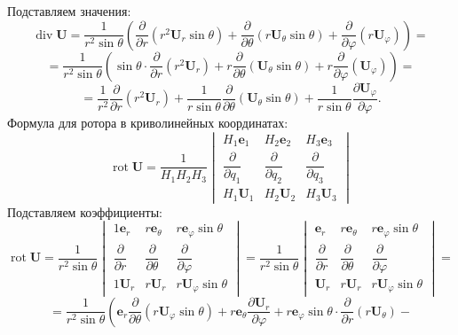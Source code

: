 \documentclass{article}
\begin{document}
\begin{enumerate}
{Подставляем значения:
$$\operatorname{div}\textbf{U} = \dfrac {1}{r^2 \sin{\theta}} \left( \dfrac {\partial}{\partial r} \left(r^2 \textbf{U}_r \sin{\theta}\right) + \dfrac {\partial}{\partial \theta} \left(r \textbf{U}_\theta \sin{\theta}\right) + \dfrac {\partial}{\partial \varphi} \left(r\textbf{U}_\varphi\right)\right)=$$
$$=\dfrac {1}{r^2 \sin{\theta}} \left(\sin{\theta} \cdot \dfrac {\partial}{\partial r} \left(r^2 \textbf{U}_r \right) + r \dfrac {\partial}{\partial \theta} \left(\textbf{U}_\theta \sin{\theta}\right) + r \dfrac {\partial}{\partial \varphi} \left(\textbf{U}_\varphi\right)\right) =$$
$$=\dfrac {1}{r^2}\dfrac {\partial}{\partial r} \left(r^2 \textbf{U}_r \right) + \dfrac {1}{r \sin{\theta}} \dfrac {\partial}{\partial \theta} \left(\textbf{U}_\theta \sin{\theta}\right) + \dfrac {1}{r \sin{\theta}} \dfrac {\partial \textbf{U}_\varphi}{\partial \varphi}.$$
Формула для ротора в криволинейных координатах:
$$\operatorname{rot}\textbf{U} = \dfrac {1}{H_1H_2H_3}
\begin{vmatrix}
  H_1\textbf{e}_1 & H_2\textbf{e}_2 & H_3\textbf{e}_3 \\
  \dfrac {\partial}{\partial q_1} & \dfrac {\partial}{\partial q_2} & \dfrac {\partial}{\partial q_3} \\
  H_1\textbf{U}_1 & H_2\textbf{U}_2 & H_3\textbf{U}_3
\end{vmatrix}
$$
Подставляем коэффициенты:
$$\operatorname{rot}\textbf{U} = \dfrac {1}{r^2 \sin{\theta}}
\begin{vmatrix}
  1\textbf{e}_r & r\textbf{e}_\theta & r\textbf{e}_\varphi\sin{\theta} \\
  \dfrac {\partial}{\partial r} & \dfrac {\partial}{\partial \theta} & \dfrac {\partial}{\partial \varphi} \\
  1\textbf{U}_r & r\textbf{U}_r & r\textbf{U}_\varphi \sin{\theta}
\end{vmatrix} =
\dfrac {1}{r^2 \sin{\theta}}
\begin{vmatrix}
  \textbf{e}_r & r\textbf{e}_\theta & r\textbf{e}_\varphi\sin{\theta} \\
  \dfrac {\partial}{\partial r} & \dfrac {\partial}{\partial \theta} & \dfrac {\partial}{\partial \varphi} \\
  \textbf{U}_r & r\textbf{U}_r & r\textbf{U}_\varphi \sin{\theta}
\end{vmatrix} =$$
$$= \dfrac {1}{r^2 \sin{\theta}} \left( \textbf{e}_r \dfrac {\partial}{\partial \theta} \left( r \textbf{U}_\varphi \sin{\theta}  \right) + r \textbf{e}_\theta \dfrac {\partial \textbf{U}_r} {\partial \varphi} + r \textbf{e}_\varphi \sin{\theta} \cdot \dfrac {\partial}{\partial r} \left( r \textbf{U}_\theta  \right) - \right.$$
}
\end{enumerate}
\end{document}
